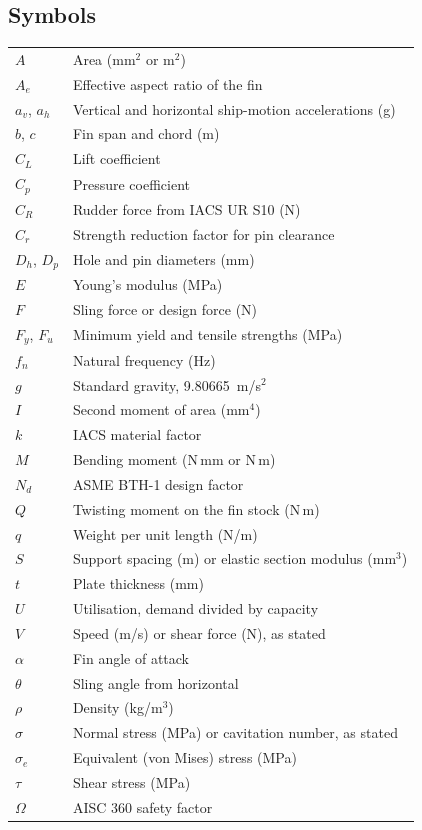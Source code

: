 \documentclass[12pt,a4paper]{report}
\begin{document}
\subsection*{Symbols}
\begin{longtable}{p{}p{}}
$A$ & Area (mm$^2$ or m$^2$)\\
$A_e$ & Effective aspect ratio of the fin\\
$a_v$, $a_h$ & Vertical and horizontal ship-motion accelerations (g)\\
$b$, $c$ & Fin span and chord (m)\\
$C_L$ & Lift coefficient\\
$C_p$ & Pressure coefficient\\
$C_R$ & Rudder force from IACS UR S10 (N)\\
$C_r$ & Strength reduction factor for pin clearance\\
$D_h$, $D_p$ & Hole and pin diameters (mm)\\
$E$ & Young's modulus (MPa)\\
$F$ & Sling force or design force (N)\\
$F_y$, $F_u$ & Minimum yield and tensile strengths (MPa)\\
$f_n$ & Natural frequency (Hz)\\
$g$ & Standard gravity, 9.80665~m/s$^2$\\
$I$ & Second moment of area (mm$^4$)\\
$k$ & IACS material factor\\
$M$ & Bending moment (N\,mm or N\,m)\\
$N_d$ & ASME BTH-1 design factor\\
$Q$ & Twisting moment on the fin stock (N\,m)\\
$q$ & Weight per unit length (N/m)\\
$S$ & Support spacing (m) or elastic section modulus (mm$^3$)\\
$t$ & Plate thickness (mm)\\
$U$ & Utilisation, demand divided by capacity\\
$V$ & Speed (m/s) or shear force (N), as stated\\
$\alpha$ & Fin angle of attack\\
$\theta$ & Sling angle from horizontal\\
$\rho$ & Density (kg/m$^3$)\\
$\sigma$ & Normal stress (MPa) or cavitation number, as stated\\
$\sigma_e$ & Equivalent (von Mises) stress (MPa)\\
$\tau$ & Shear stress (MPa)\\
$\Omega$ & AISC 360 safety factor\\
\end{longtable}
\end{document}
